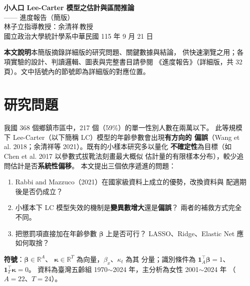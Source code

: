\documentclass[UTF8, fontset=macnew, a4paper, 12pt]{ctexart}
\begin{document}
\begin{center}
{\bfseries 小人口 Lee-Carter 模型之估計與區間推論}\\[3pt]
{ —— 進度報告（簡版）}\\[10pt]
{ 林子立\quad 指導教授：余清祥\,教授}\\[3pt]
{ 國立政治大學統計學系\qquad 中華民國 115 年 9 月 21 日}
\end{center}

\vspace{4pt}
\begin{center}
\begin{minipage}{0.93\textwidth}\small
\textbf{本文說明}\quad 本簡版摘錄詳細版的研究問題、關鍵數據與結論，
供快速瀏覽之用；各項實驗的設計、判讀邏輯、圖表與完整書目請參閱
《進度報告》（詳細版，共 32 頁）。文中括號內的節號即為詳細版的對應位置。
\end{minipage}
\end{center}

\vspace{8pt}

\section{研究問題}

我國 368 個鄉鎮市區中，217 個（59\%）的單一性別人數在兩萬以下。
此等規模下 Lee-Carter（以下簡稱 LC）模型的年齡參數會出現\textbf{有方向的
偏誤}（Wang et al. 2018；余清祥等 2021）。既有的小樣本研究多以量化
\textbf{不確定性}為目標（如 Chen et al. 2017 以參數式拔靴法刻畫最大概似
估計量的有限樣本分布），較少追問估計是否\textbf{系統性偏移}。
本文提出三個依序遞進的問題：

\begin{enumerate}[leftmargin=*]
  \item Rabbi and Mazzuco（2021）在國家級資料上成立的優勢，改換資料與
        配適期後是否仍成立？
  \item 小樣本下 LC 模型失效的機制是\textbf{變異數增大}還是\textbf{偏誤}？
        兩者的補救方式完全不同。
  \item 把懲罰項直接加在年齡參數 $\boldsymbol{\beta}$ 上是否可行？
        LASSO、Ridge、Elastic Net 應如何取捨？
\end{enumerate}

\textbf{符號}：$\boldsymbol{\beta}\in\mathbb{R}^{A}$、
$\boldsymbol{\kappa}\in\mathbb{R}^{T}$ 為向量，$\beta_x$、$\kappa_t$ 為其
分量；識別條件為 $\mathbf{1}_A^{\!\top}\boldsymbol{\beta}=1$、
$\mathbf{1}_T^{\!\top}\boldsymbol{\kappa}=0$。
資料為臺灣五齡組 1970$\sim$2024 年，主分析為女性 2001$\sim$2024 年
（$A=22$、$T=24$）。
\end{document}
